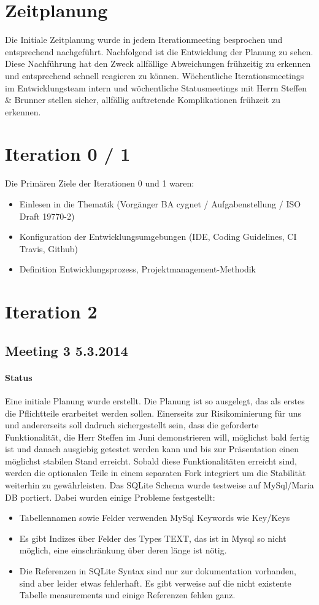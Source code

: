 \section{Zeitplanung}
Die Initiale Zeitplanung wurde in jedem Iterationmeeting besprochen und entsprechend nachgeführt. Nachfolgend ist die Entwicklung der Planung zu sehen. Diese Nachführung hat den Zweck allfällige Abweichungen frühzeitig zu erkennen und entsprechend schnell reagieren zu können. Wöchentliche Iterationsmeetings im Entwicklungsteam intern und wöchentliche Statusmeetings mit Herrn Steffen \& Brunner stellen sicher, allfällig auftretende Komplikationen frühzeit zu erkennen.


\section{Iteration 0 / 1}
Die Primären Ziele der Iterationen 0 und 1 waren:
\begin{itemize}
\item Einlesen in die Thematik (Vorgänger BA cygnet / Aufgabenstellung / ISO Draft 19770-2)
\item Konfiguration der Entwicklungsumgebungen (IDE, Coding Guidelines, CI Travis, Github)
\item Definition Entwicklungsprozess, Projektmanagement-Methodik
\end{itemize}

\section{Iteration 2}
\subsection{Meeting 3 5.3.2014}
\paragraph{Status}
Eine initiale Planung wurde erstellt. Die Planung ist so ausgelegt, das als erstes die Pflichtteile erarbeitet werden sollen. Einerseits zur Risikominierung für uns und andererseits soll dadruch sichergestellt sein, dass die geforderte Funktionalität,  die Herr Steffen im Juni demonstrieren will, möglichst bald fertig ist und danach ausgiebig getestet werden kann und bis zur Präsentation einen möglichst stabilen Stand erreicht. Sobald diese Funktionalitäten erreicht sind, werden die optionalen Teile in einem separaten Fork integriert um die Stabilität weiterhin zu gewährleisten.
Das SQLite Schema wurde testweise auf MySql/Maria DB portiert. Dabei wurden einige Probleme festgestellt:
\begin{itemize}
\item Tabellennamen sowie Felder verwenden MySql Keywords wie Key/Keys
\item Es gibt Indizes über Felder des Types TEXT, das ist in Mysql so nicht möglich, eine einschränkung über deren länge ist nötig.
\item Die Referenzen in SQLite Syntax sind nur zur dokumentation vorhanden, sind aber leider etwas fehlerhaft. Es gibt verweise auf die nicht existente Tabelle measurements und einige Referenzen fehlen ganz. 
\end{itemize}

